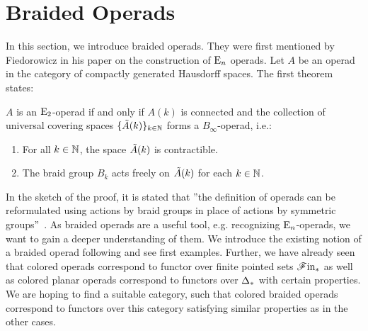 
\section{Braided Operads}\label{sec:braidedoperads} 

    In this section, we introduce braided operads. They were first
    mentioned by Fiedorowicz in his paper \cite{EO} on the construction of
    $\operatorname{E}_n$ operads. Let $A$ be an operad in the  category of compactly generated
    Hausdorff spaces. The first theorem states:

    \begin{thm}
        $A$ is an $\operatorname{E}_2$-operad if and only if $A(k)$ is connected and the collection of
        universal covering spaces $\{\Tilde{A}(k)\}_{k \in \mathbb{N}}$ forms a
        $B_{\infty}$-operad, i.e.:
        \begin{enumerate}[(1)]
            \item For all $k \in \mathbb{N}$, the space $\Tilde{A}(k)$ is contractible.
            \item The braid group  $B_k$ acts freely on $\Tilde{A}(k)$ for each
            $k \in \mathbb{N}$.
        \end{enumerate}
    \end{thm}

    In the sketch of the proof, it is stated that ''the definition of operads can
    be reformulated using actions by braid groups in place of actions by
    symmetric groups''~\cite{EO}. As braided operads are a useful tool, e.g.
    recognizing $\operatorname{E}_n$-operads, we want to gain a deeper understanding of
    them. We introduce the existing notion of a braided operad following \cite[Chapter 4,5]{yau}
    and see first examples. Further, we have already seen that colored operads
    correspond to functor over finite pointed sets $\mathscr{F} \text{in}_{\ast}$ as well as
    colored planar operads correspond to functors over $\Delta_{\ast}$ with 
    certain properties. We are
    hoping to find a suitable category, such that colored braided operads
    correspond to functors over this category satisfying similar 
    properties as in the other cases. 
    
    

